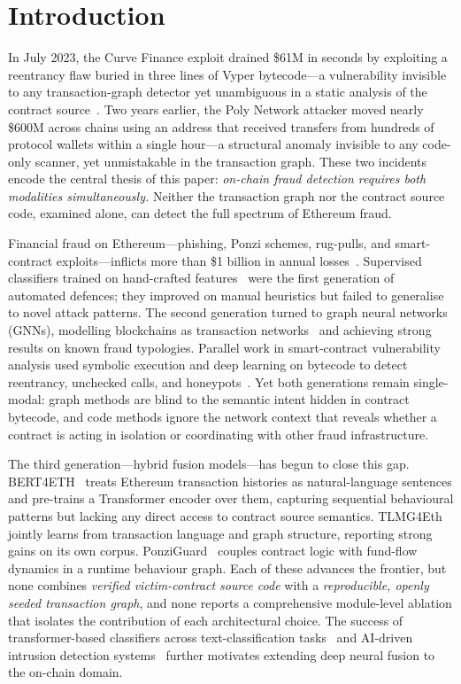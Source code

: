 \section{Introduction}
\label{sec:introduction}

In July 2023, the Curve Finance exploit drained \$61M in seconds by
exploiting a reentrancy flaw buried in three lines of Vyper bytecode---a
vulnerability invisible to any transaction-graph detector yet unambiguous
in a static analysis of the contract source~\cite{defihacklabs2024}.
Two years earlier, the Poly Network attacker moved nearly \$600M across
chains using an address that received transfers from hundreds of protocol
wallets within a single hour---a structural anomaly invisible to any
code-only scanner, yet unmistakable in the transaction graph.
These two incidents encode the central thesis of this paper:
\emph{on-chain fraud detection requires both modalities simultaneously.}
Neither the transaction graph nor the contract source code, examined alone,
can detect the full spectrum of Ethereum fraud.

Financial fraud on Ethereum---phishing, Ponzi schemes, rug-pulls, and
smart-contract exploits---inflicts more than \$1 billion in annual
losses~\cite{chainalysis2023}.
Supervised classifiers trained on hand-crafted
features~\cite{ostapowicz2019,blanco2022,ashfaq2022,elmougy2023} were
the first generation of automated defences; they improved on manual
heuristics but failed to generalise to novel attack patterns.
The second generation turned to graph neural networks (GNNs), modelling
blockchains as transaction networks~\cite{kim2023,zhou2021,ctgcn2024}
and achieving strong results on known fraud typologies.
Parallel work in smart-contract vulnerability analysis used symbolic
execution and deep learning on bytecode to detect reentrancy, unchecked
calls, and honeypots~\cite{luu2016oyente,tsankov2018securify,
sun2024gptscan}.
Yet both generations remain single-modal: graph methods are blind to the
semantic intent hidden in contract bytecode, and code methods ignore the
network context that reveals whether a contract is acting in isolation or
coordinating with other fraud infrastructure.

The third generation---hybrid fusion models---has begun to close this
gap.  BERT4ETH~\cite{hu2023bert4eth} treats Ethereum transaction
histories as natural-language sentences and pre-trains a Transformer
encoder over them, capturing sequential behavioural patterns but lacking
any direct access to contract source semantics.
TLMG4Eth~\cite{sun2025tlmg4eth} jointly learns from transaction language
and graph structure, reporting strong gains on its own corpus.
PonziGuard~\cite{liang2025ponziguard} couples contract logic with fund-flow
dynamics in a runtime behaviour graph.
Each of these advances the frontier, but none combines
\emph{verified victim-contract source code} with a \emph{reproducible,
openly seeded transaction graph}, and none reports a comprehensive
module-level ablation that isolates the contribution of each architectural
choice.  The success of transformer-based classifiers across
text-classification tasks~\cite{poudel2026fakenews} and AI-driven
intrusion detection systems~\cite{miya2024indekx} further motivates
extending deep neural fusion to the on-chain domain.

